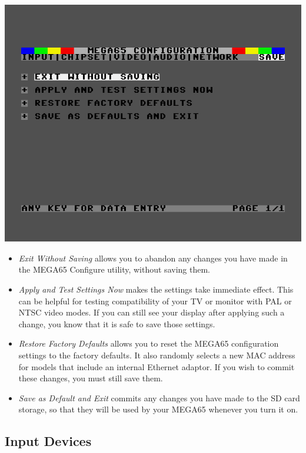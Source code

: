 \includegraphics[width=\linewidth]{images/ss-m65config-save.png}

\begin{itemize}
  \item{\em Exit Without Saving} allows you to abandon any changes you
    have made in the MEGA65 Configure utility, without saving them.
  \item{\em Apply and Test Settings Now} makes the settings take
    immediate effect.  This can be helpful for testing compatibility
    of your TV or monitor with PAL or NTSC video modes.  If you can
    still see your display after applying such a change, you know
    that it is safe to save those settings.
  \item{\em Restore Factory Defaults} allows you to reset the
    MEGA65 configuration settings to the factory defaults. It also
    randomly selects a new MAC address for models that include an
    internal Ethernet adaptor.  If you wish to commit these
    changes, you must still save them.
  \item{\em Save as Default and Exit} commits any changes you
    have made to the SD card storage, so that they will be used
    by your MEGA65 whenever you turn it on.
\end{itemize}

\subsection{Input Devices}

